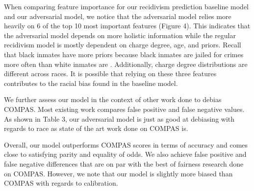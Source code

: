 \documentclass{article}
\begin{document}

When comparing feature importance for our recidivism prediction baseline model and our adversarial model, we notice that the adversarial model relies more heavily on 6 of the top 10 most important features (Figure 4). This indicates that the adversarial model depends on more holistic information while the regular recidivism model is mostly dependent on charge degree, age, and priors. Recall that black inmates have more priors because black inmates are jailed for crimes more often than white inmates are \cite{Fenton}. Additionally, charge degree distributions are different across races. It is possible that relying on these three features contributes to the racial bias found in the baseline model.


We further assess our model in the context of other work done to debias COMPAS. Most existing work compares false positive and false negative values. As shown in Table 3, our adversarial model is just as good at debiasing with regards to race as state of the art work done on COMPAS is.

Overall, our model outperforms COMPAS scores in terms of accuracy and comes close to satisfying parity and equality of odds. We also achieve false positive and false negative differences that are on par with the best of fairness research done on COMPAS. However, we note that our model is slightly more biased than COMPAS with regards to calibration.
\end{document}
